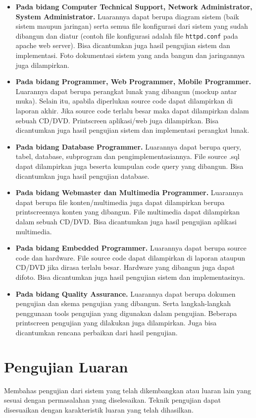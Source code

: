 \documentclass[a4paper,11pt,oneside]{report}
\begin{document}
\begin{itemize}
    \item \textbf{Pada bidang Computer Technical Support, Network Administrator,
    System Administrator.} Luarannya dapat berupa diagram sistem (baik sistem
    maupun jaringan) serta semua file konfigurasi dari sistem yang sudah dibangun
    dan diatur (contoh file konfigurasi adalah file \texttt{httpd.conf} pada
    apache web server). Bisa dicantumkan juga hasil pengujian sistem dan
    implementasi. Foto dokumentasi sistem yang anda bangun dan jaringannya juga
    dilampirkan.
    \item \textbf{Pada bidang Programmer, Web Programmer, Mobile Programmer.}
    Luarannya dapat berupa perangkat lunak yang dibangun (mockup antar muka).
    Selain itu, apabila diperlukan source code dapat dilampirkan di laporan
    akhir. Jika source code terlalu besar maka dapat dilampirkan dalam sebuah
    CD/DVD. Printscreen aplikasi/web juga dilampirkan. Bisa dicantumkan juga
    hasil pengujian sistem dan implementasi perangkat lunak.
    \item \textbf{Pada bidang Database Programmer.} Luarannya dapat berupa query,
    tabel, database, subprogram dan pengimplementasiannya. File source .sql
    dapat dilampirkan juga beserta kumpulan code query yang dibangun. Bisa
    dicantumkan juga hasil pengujian database.
    \item \textbf{Pada bidang Webmaster dan Multimedia Programmer.} Luarannya
    dapat berupa file konten/multimedia juga dapat dilampirkan berupa
    printscreennya konten yang dibangun. File multimedia dapat dilampirkan dalam
    sebuah CD/DVD. Bisa dicantumkan juga hasil pengujian aplikasi multimedia.
    \item \textbf{Pada bidang Embedded Programmer.} Luarannya dapat berupa source
    code dan hardware. File source code dapat dilampirkan di laporan ataupun
    CD/DVD jika dirasa terlalu besar. Hardware yang dibangun juga dapat difoto.
    Bisa dicantumkan juga hasil pengujian sistem dan implementasinya.
    \item \textbf{Pada bidang Quality Assurance.} Luarannya dapat berupa dokumen
    pengujian dan skema pengujian yang dibangun. Serta langkah-langkah penggunaan
    tools pengujian yang digunakan dalam pengujian. Beberapa printscreen pengujian
    yang dilakukan juga dilampirkan. Juga bisa dicantumkan rencana perbaikan dari
    hasil pengujian.
\end{itemize}

\section{Pengujian Luaran}
Membahas pengujian dari sistem yang telah dikembangkan atau luaran lain yang
sesuai dengan permasalahan yang diselesaikan. Teknik pengujian dapat
disesuaikan dengan karakteristik luaran yang telah dihasilkan.
\end{document}
